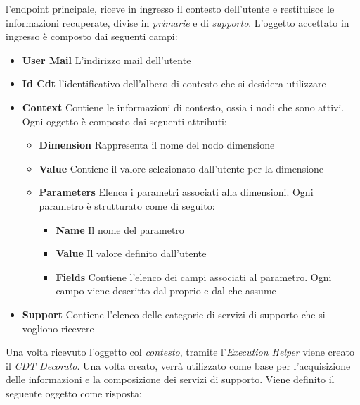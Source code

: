 \upe l'endpoint principale, riceve in ingresso il contesto dell'utente e restituisce le informazioni recuperate, divise in \emph{primarie} e di \emph{supporto}. L'oggetto accettato in ingresso è composto dai seguenti campi:

\begin{itemize}
	\item \textbf{User Mail} L'indirizzo mail dell'utente
	\item \textbf{Id Cdt} \upe l'identificativo dell'albero di contesto che si desidera utilizzare
	\item \textbf{Context} Contiene le informazioni di contesto, ossia i nodi che sono attivi. Ogni oggetto è composto dai seguenti attributi:
	\begin{itemize}
		\item \textbf{Dimension} Rappresenta il nome del nodo dimensione
		\item \textbf{Value} Contiene il valore selezionato dall'utente per la dimensione
		\item \textbf{Parameters} Elenca i parametri associati alla dimensioni. Ogni parametro è strutturato come di seguito:
		\begin{itemize}
			\item \textbf{Name} Il nome del parametro
			\item \textbf{Value} Il valore definito dall'utente
			\item \textbf{Fields} Contiene l'elenco dei campi associati al parametro. Ogni campo viene descritto dal proprio  e dal  che assume
		\end{itemize}
	\end{itemize}
	\item \textbf{Support} Contiene l'elenco delle categorie di servizi di supporto che si vogliono ricevere
\end{itemize}

Una volta ricevuto l'oggetto col \emph{contesto}, tramite l'\emph{Execution Helper} viene creato il \emph{CDT Decorato}. Una volta creato, verrà utilizzato come base per l'acquisizione delle informazioni e la composizione dei servizi di supporto. Viene definito il seguente oggetto come risposta:

